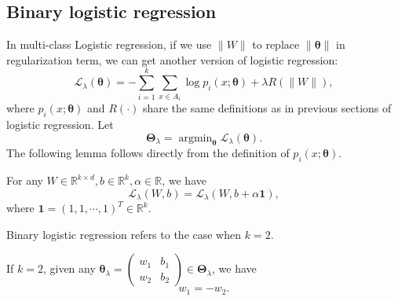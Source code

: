 \subsection{Binary logistic regression}
In multi-class Logistic regression, if we use $\|W\|$ to replace $\|\bm\theta\|$ in regularization term,  we can get another version of logistic regression:
\begin{equation}
	\mathcal L_\lambda(\bm \theta) = - \sum_{i=1}^k \sum_{x\in A_i} \log p_{i}(x;\bm \theta) + \lambda R(\|W\|),
\end{equation}
where $p_i(x;\bm \theta)$ and $R(\cdot)$ share the same definitions as in previous sections of logistic regression.
Let  
\begin{equation}
\bm\Theta_{\lambda} = \mathop{{\arg\min}}_{\bm\theta}  \mathcal L_\lambda(\bm\theta).
\end{equation}
The following lemma follows directly from the definition of $p_{i}(x;\bm \theta)$.
\begin{lemma}
	For any $W\in \mathbb{R}^{k\times d}, b\in \mathbb{R}^k, \alpha \in \mathbb{R}$, we have
	\begin{equation}
		\mathcal L_\lambda(W,b) = \mathcal L_\lambda(W,b + \alpha \bm 1),
	\end{equation}
	where $\bm 1 = (1,1,\cdots,1)^T\in\mathbb{R}^k.$
\end{lemma}

Binary logistic regression refers to the case when $k=2$.
\begin{lemma}
	If $k = 2$, given any $\bm\theta_\lambda = \begin{pmatrix}
	w_1 &  b_1\\
	w_2 & b_2 
	\end{pmatrix} \in \bm\Theta_\lambda$, we have
	\begin{equation*}
         w_1 = -w_2.
	\end{equation*}
\end{lemma}

